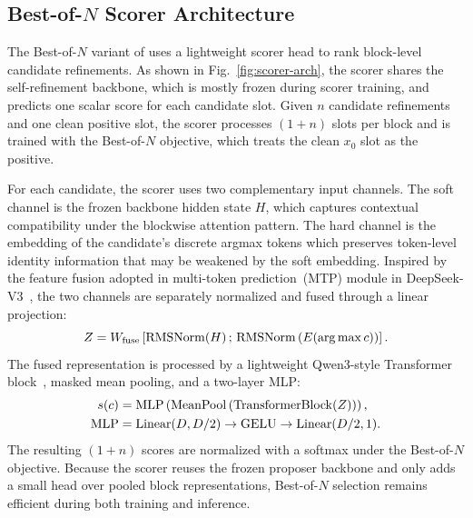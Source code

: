 \subsection{Best-of-$N$ Scorer Architecture}
\label{app:scorer_arch}

The Best-of-$N$ variant of \method uses a lightweight scorer head to rank block-level candidate refinements. 
As shown in Fig.~\ref{fig:scorer-arch}, the scorer shares the self-refinement backbone, which is mostly frozen during scorer training, and predicts one scalar score for each candidate slot. 
Given $n$ candidate refinements and one clean positive slot, the scorer processes $(1+n)$ slots per block and is trained with the Best-of-$N$ objective, which treats the clean $x_0$ slot as the positive.

For each candidate, the scorer uses two complementary input channels. 
The soft channel is the frozen backbone hidden state $H$, which captures contextual compatibility under the blockwise attention pattern. 
The hard channel is the embedding of the candidate's discrete argmax tokens which preserves token-level identity information that may be weakened by the soft embedding. 
Inspired by the feature fusion adopted in multi-token prediction~(MTP) module in DeepSeek-V3~\citep{deepseek-v3}, the two channels are separately normalized and fused through a linear projection:
\[
    Z
    =
    W_{\mathrm{fuse}}
    \left[
        \mathrm{RMSNorm}(H)
        \,;\,
        \mathrm{RMSNorm}\left(E(\arg\max c)\right)
    \right].
\]
The fused representation is processed by a lightweight Qwen3-style Transformer block~\citep{qwen3}, masked mean pooling, and a two-layer MLP:
\begin{align*}
    s(c)
    &=
    \mathrm{MLP}
    \left(
        \mathrm{MeanPool}
        \left(
            \mathrm{TransformerBlock}(Z)
        \right)
    \right),
    \\
    \mathrm{MLP}
    &=
    \mathrm{Linear}(D,D/2)
    \rightarrow
    \mathrm{GELU}
    \rightarrow
    \mathrm{Linear}(D/2,1).
\end{align*}
The resulting $(1+n)$ scores are normalized with a softmax under the Best-of-$N$ objective. 
Because the scorer reuses the frozen proposer backbone and only adds a small head over pooled block representations, Best-of-$N$ selection remains efficient during both training and inference.



